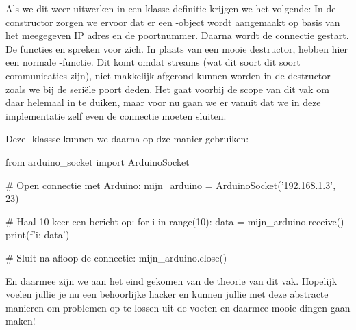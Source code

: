 \newpage

Als we dit weer uitwerken in een klasse-definitie krijgen we het volgende:
In de constructor zorgen we ervoor dat er een -object wordt aangemaakt op basis van het meegegeven IP adres en de poortnummer. Daarna wordt de connectie gestart. De functies  en  spreken voor zich. \newline
In plaats van een mooie destructor, hebben hier een normale -functie. Dit komt omdat streams (wat dit soort dit soort communicaties zijn), niet makkelijk afgerond kunnen worden in de destructor zoals we bij de seriële poort deden. Het gaat voorbij de scope van dit vak om daar helemaal in te duiken, maar voor nu gaan we er vanuit dat we in deze implementatie zelf even de connectie moeten sluiten. \newline

Deze -klassse kunnen we daarna op dze manier gebruiken:
\begin{python}
from arduino_socket import ArduinoSocket

# Open connectie met Arduino:
mijn_arduino = ArduinoSocket('192.168.1.3', 23)

# Haal 10 keer een bericht op:
for i in range(10):
    data = mijn_arduino.receive()
    print(f'{i}: {data}')

# Sluit na afloop de connectie:
mijn_arduino.close()
\end{python}

En daarmee zijn we aan het eind gekomen van de theorie van dit vak. Hopelijk voelen jullie je nu een behoorlijke hacker en kunnen jullie met deze abstracte manieren om problemen op te lossen uit de voeten en daarmee mooie dingen gaan maken!

%


